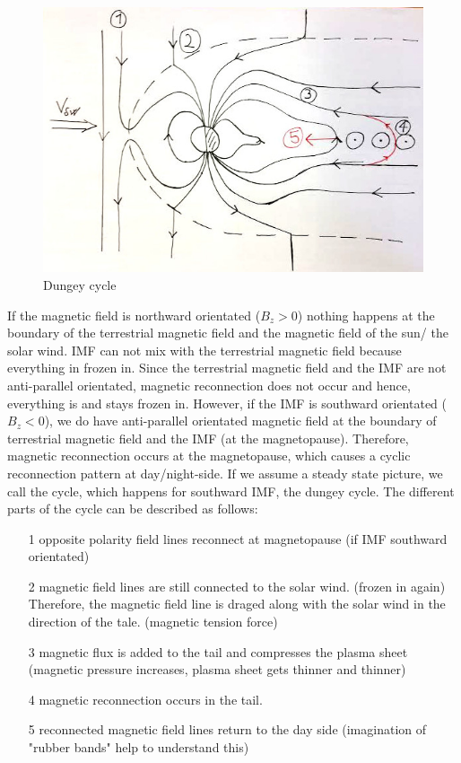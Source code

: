 \documentclass[10pt,a4paper]{article}
\begin{document}
\begin{figure}[h]
\centering
\caption{Dungey cycle}
\label{aurora substorm}
\includegraphics[scale=0.5]{solvind.jpg}
\end{figure}

If the magnetic field is northward orientated ($B_z>0$) nothing happens at the boundary of the terrestrial magnetic field and the magnetic field of the sun/ the solar wind. IMF can not mix with the terrestrial magnetic field because everything in frozen in. Since the terrestrial magnetic field and the IMF are not anti-parallel orientated, magnetic reconnection does not occur and hence, everything is and stays frozen in. 
However, if the IMF is southward orientated ($B_z<0$), we do have anti-parallel orientated magnetic field at the boundary of terrestrial magnetic field and the IMF (at the magnetopause). Therefore, magnetic reconnection occurs at the magnetopause, which causes a cyclic reconnection pattern at day/night-side. If we assume a steady state picture, we call the cycle, which happens for southward IMF, the dungey cycle. The different parts of the cycle can be described as follows:
\begin{itemize}
\item[1] opposite polarity field lines reconnect at magnetopause (if IMF southward orientated)
\item[2] magnetic field lines are still connected to the solar wind. (frozen in again) Therefore, the magnetic field line is draged along with the solar wind in the direction of the tale. (magnetic tension force)
\item[3] magnetic flux is added to the tail and compresses the plasma sheet (magnetic pressure increases, plasma sheet gets thinner and thinner)
\item[4] magnetic reconnection occurs in the tail. 
\item[5] reconnected magnetic field lines return to the day side (imagination of "rubber bands" help to understand this)
\end{itemize}
\end{document}
